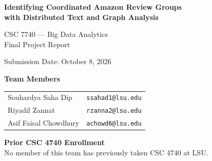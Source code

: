 \documentclass[12pt]{article}
\begin{document}
\thispagestyle{empty}
\vspace*{1.2in}
\begin{center}
  {\LARGE\bfseries Identifying Coordinated Amazon Review Groups\\[0.3em]
   with Distributed Text and Graph Analysis\par}

  \vspace{1.0in}

  {\large CSC 7740 --- Big Data Analytics\\
   Final Project Report\par}

  \vspace{0.5in}

  {\large Submission Date: October 8, 2026\par}

  \vspace{0.8in}

  {\large\bfseries Team Members\par}
  \vspace{0.4em}
  \begin{tabular}{ll}
    Souhardya Saha Dip    & \texttt{ssahad1@lsu.edu} \\
    Riyadil Zannat        & \texttt{rzanna2@lsu.edu} \\
    Asif Faisal Chowdhury & \texttt{achowd6@lsu.edu} \\
  \end{tabular}

  \vspace{0.8in}

  \begin{minipage}{0.85\textwidth}
    \centering
    \textbf{Prior CSC 4740 Enrollment}\\[0.3em]
    No member of this team has previously taken CSC 4740 at LSU.
  \end{minipage}
\end{center}

\newpage

\thispagestyle{empty}
\tableofcontents

\newpage
\setcounter{page}{1}

\end{document}
